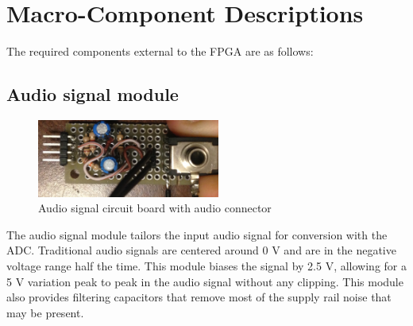 \documentclass[12pt]{article}
\begin{document}
  \section*{Macro-Component Descriptions}
    The required components external to the FPGA are as follows:
    \subsection*{Audio signal module}
      \begin{figure}[H]
        \centering
        \includegraphics[width=60mm]{audio_sig_mod.JPG}
        \caption{Audio signal circuit board with audio connector}
        \label{overflow}
      \end{figure}
      The audio signal module tailors the input audio signal for conversion with the ADC. Traditional audio signals are centered around 0 V and are in the negative voltage range half the time. This module biases the signal by 2.5 V, allowing for a 5 V variation peak to peak in the audio signal without any clipping. This module also provides filtering capacitors that remove most of the supply rail noise that may be present.
\end{document}
